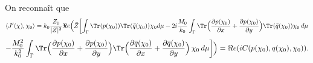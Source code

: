 \begin{tcolorbox}[colback=green!5!white,colframe=green!75!black,title=Théorème 6.2.2: Dérivée du Lagrangien]

On reconnaît que 
\[\langle J'(\chi), \chi_0\rangle = k_0\frac{Z_0}{|Z|^2}\Re e\Big( \Bar{Z}\biggl[ \int_{\Gamma} \Tr(p(\chi_0)) \Tr(\Bar{q}(\chi_0))\chi_0 d\mu -2i\frac{M_0}{k_0} \int_{\Gamma} \Tr \Bigl( \frac{\partial p(\chi_0)}{\partial x}+\frac{\partial p(\chi_0)}{\partial y} \Bigr)\Tr(\Bar{q}(\chi_0))\chi_0 \hspace{2pt} d\mu\]
\[ -\frac{M_0^2}{k_0^2}\int_{\Gamma} \Tr \Bigl( \frac{\partial p(\chi_0)}{\partial x}+\frac{\partial p(\chi_0)}{\partial y}\Bigr)\Tr\Bigl( \frac{\partial \overline{q}(\chi_0)}{\partial x}+\frac{\partial \overline{q}(\chi_0)}{\partial y}\Bigr) \hspace{2pt} \chi_0  \hspace{2pt} d\mu\biggr ]\Big) = \Re e(iC(p(\chi_0),q(\chi_0),\chi_0)).\]
\end{tcolorbox}